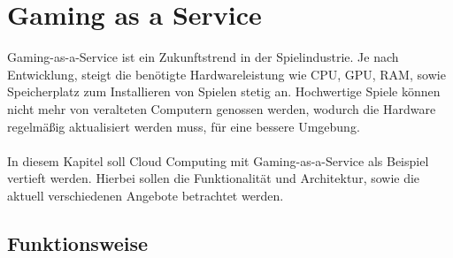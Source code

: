 \documentclass[12pt,toc=bib,toc=listof]{scrreprt}
\begin{document}
\chapter{Gaming as a Service}
\label{sec: Gaming as a Service}

Gaming-as-a-Service ist ein Zukunftstrend in der Spielindustrie. Je nach Entwicklung, steigt die benötigte Hardwareleistung 
wie CPU, GPU, RAM, sowie Speicherplatz zum Installieren von Spielen stetig an. Hochwertige Spiele können nicht mehr von veralteten 
Computern genossen werden, wodurch die Hardware regelmäßig aktualisiert werden muss, für eine bessere Umgebung. 
\\ \\
In diesem Kapitel soll Cloud Computing mit Gaming-as-a-Service als Beispiel vertieft werden. Hierbei sollen die Funktionalität und Architektur, 
sowie die aktuell verschiedenen Angebote betrachtet werden.


\section{Funktionsweise}
\label{sec:Funktionsweise}
\end{document}
